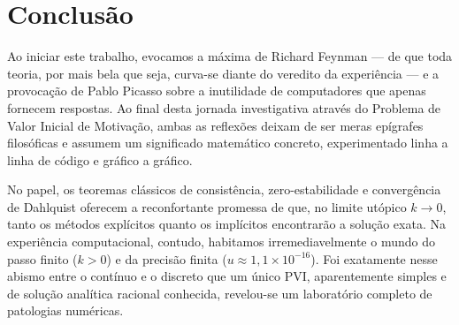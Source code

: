 \documentclass[12pt, a4paper]{article}
\begin{document}
\section{Conclusão}
\label{sec:conclusao}

Ao iniciar este trabalho, evocamos a máxima de Richard Feynman — de que toda teoria, por mais bela que seja, curva-se diante do veredito da experiência — e a provocação de Pablo Picasso sobre a inutilidade de computadores que apenas fornecem respostas. Ao final desta jornada investigativa através do Problema de Valor Inicial de Motivação, ambas as reflexões deixam de ser meras epígrafes filosóficas e assumem um significado matemático concreto, experimentado linha a linha de código e gráfico a gráfico.

No papel, os teoremas clássicos de consistência, zero-estabilidade e convergência de Dahlquist oferecem a reconfortante promessa de que, no limite utópico $k \to 0$, tanto os métodos explícitos quanto os implícitos encontrarão a solução exata. Na experiência computacional, contudo, habitamos irremediavelmente o mundo do passo finito ($k > 0$) e da precisão finita ($u \approx 1{,}1 \times 10^{-16}$). Foi exatamente nesse abismo entre o contínuo e o discreto que um único PVI, aparentemente simples e de solução analítica racional conhecida, revelou-se um laboratório completo de patologias numéricas.
\end{document}

